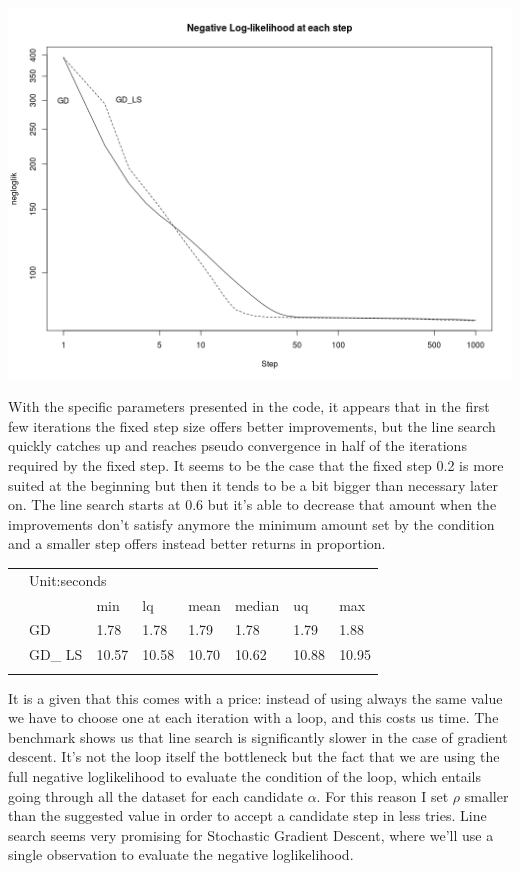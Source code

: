 \documentclass{article}
\begin{document}
\includegraphics[width=\textwidth]{Rplot_line_search.png}

With the specific parameters presented in the code, it appears that in the first few iterations the fixed step size offers better improvements, but the line search quickly catches up and reaches pseudo convergence in half of the iterations required by the fixed step. It seems to be the case that the fixed step 0.2 is more suited at the beginning but then it tends to be a bit bigger than necessary later on. The line search starts at 0.6 but it's able to decrease that amount when the improvements don't satisfy anymore the minimum amount set by the condition and a smaller step offers instead better returns in proportion.\\

\begin{tabular}{llllllll}
&\multicolumn{7}{l}{Unit:seconds} \\
&      &min      &  lq     & mean     & median   &     uq   &    max   \\
&GD   &1.78  &1.78 & 1.79 & 1.78 & 1.79 & 1.88 \\
&GD\_ LS&10.57 &10.58& 10.70& 10.62& 10.88& 10.95\\
&\multicolumn{7}{l}{} 
\end{tabular}

It is a given that this comes with a price: instead of using always the same value we have to choose one at each iteration with a loop, and this costs us time. The benchmark shows us that line search is significantly slower in the case of gradient descent. It's not the loop itself the bottleneck but the fact that we are using the full negative loglikelihood to evaluate the condition of the loop, which entails going through all the dataset for each candidate $\alpha$. For this reason I set $\rho$ smaller than the suggested value in order to accept a candidate step in less tries. Line search seems very promising for Stochastic Gradient Descent, where we'll use a single observation to evaluate the negative loglikelihood.
\end{document}
